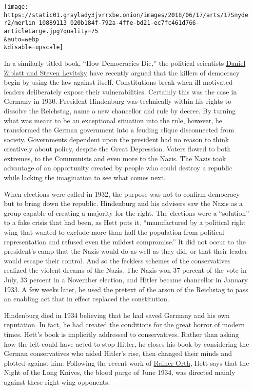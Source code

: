 \texttt{[image: https://static01.graylady3jvrrxbe.onion/images/2018/06/17/arts/17Snyder2/merlin\_10889113\_020b184f-792a-4ffe-bd21-ec7fc461d766-articleLarge.jpg?quality=75\\\&auto=webp\\\&disable=upscale]}

In a similarly titled book, ``How Democracies Die,'' the political
scientists
\href{https://www.theguardian.com/us-news/commentisfree/2018/jan/21/this-is-how-democracies-die}{Daniel
Ziblatt and Steven Levitsky} have recently argued that the killers of
democracy begin by using the law against itself. Constitutions break
when ill-motivated leaders deliberately expose their vulnerabilities.
Certainly this was the case in Germany in 1930. President Hindenburg was
technically within his rights to dissolve the Reichstag, name a new
chancellor and rule by decree. By turning what was meant to be an
exceptional situation into the rule, however, he transformed the German
government into a feuding clique disconnected from society. Governments
dependent upon the president had no reason to think creatively about
policy, despite the Great Depression. Voters flowed to both extremes, to
the Communists and even more to the Nazis. The Nazis took advantage of
an opportunity created by people who could destroy a republic while
lacking the imagination to see what comes next.

When elections were called in 1932, the purpose was not to confirm
democracy but to bring down the republic. Hindenburg and his advisers
saw the Nazis as a group capable of creating a majority for the right.
The elections were a ``solution'' to a fake crisis that had been, as
Hett puts it, ``manufactured by a political right wing that wanted to
exclude more than half the population from political representation and
refused even the mildest compromise.'' It did not occur to the
president's camp that the Nazis would do as well as they did, or that
their leader would escape their control. And so the feckless schemes of
the conservatives realized the violent dreams of the Nazis. The Nazis
won 37 percent of the vote in July, 33 percent in a November election,
and Hitler became chancellor in January 1933. A few weeks later, he used
the pretext of the arson of the Reichstag to pass an enabling act that
in effect replaced the constitution.

Hindenburg died in 1934 believing that he had saved Germany and his own
reputation. In fact, he had created the conditions for the great horror
of modern times. Hett's book is implicitly addressed to conservatives.
Rather than asking how the left could have acted to stop Hitler, he
closes his book by considering the German conservatives who aided
Hitler's rise, then changed their minds and plotted against him.
Following the recent work of
\href{https://www.cambridge.org/core/journals/central-european-history/article/der-amtssitz-der-opposition-politik-und-staatsumbauplane-im-buro-des-stellvertreters-des-reichskanzlers-in-den-jahren-19331934-by-rainer-orth-cologne-bohlau-verlag-2016-pp-1118-cloth-9000-isbn-9783412505554/C1E87000AC4D05F29CED7E3BE26E512A}{Rainer
Orth}, Hett says that the Night of the Long Knives, the blood purge of
June 1934, was directed mainly against these right-wing opponents.

